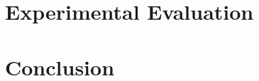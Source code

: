 \documentclass[a4paper, onecolumn, 12pt]{article}
\begin{document}
\section{Experimental Evaluation} 

\section{Conclusion}
\label{sec:con}




\end{document}
